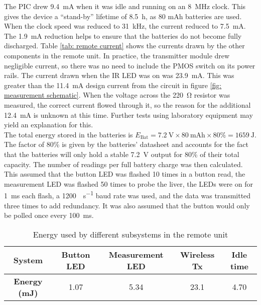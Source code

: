 The PIC drew \SI{9.4}{\milli\ampere} when it was idle and running on an \SI{8}{\mega\hertz} clock. This gives the device a ``stand-by'' lifetime of \SI{8.5}{\hour}, as 80 mAh batteries are used. When the clock speed was reduced to \SI{31}{\kilo\hertz}, the current reduced to \SI{7.5}{\milli\ampere}. The \SI{1.9}{\milli\ampere} reduction helps to ensure that the batteries do not become fully discharged. Table \ref{tab: remote current} shows the currents drawn by the other components in the remote unit. In practice, the transmitter module drew negligible current, so there was no need to include the PMOS switch on its power rails. The current drawn when the IR LED was on was \SI{23.9}{\milli\ampere}. This was greater than the \SI{11.4}{\milli\ampere} design current from the circuit in figure \ref{fig: measurement schematic}. When the voltage across the \SI{220}{\ohm} resistor was measured, the correct current flowed through it, so the reason for the additional \SI{12.4}{\milli\ampere} is unknown at this time. Further tests using laboratory equipment may yield an explanation for this.\\

The total energy stored in the batteries is $E_\text{Bat} = \SI{7.2}{\volt}\times\SI{80}{\milli\ampere\hour}\times 80\% = \SI{1659}{\joule}$. The factor of 80\% is given by the batteries' datasheet \cite{rs_pro_batteries} and accounts for the fact that the batteries will only hold a stable \SI{7.2}{\volt} output for 80\% of their total capacity. The number of readings per full battery charge was then calculated. This assumed that the button LED was flashed 10 times in a button read, the measurement LED was flashed 50 times to probe the liver, the LEDs were on for \SI{1}{\milli\second} each flash, a \SI{1200}{\bit\per\second} baud rate was used, and the data was transmitted three times to add redundancy. It was also assumed that the button would only be polled once every \SI{100}{\milli\second}.\\

\begin{table}[ht]
	\begin{center}
	\caption{Energy used by different subsystems in the remote unit}
	\label{tab: remote energy}
	\begin{tabular}{*{5}{|c}|}
	\hline
	\textbf{System} & Button LED & Measurement LED & Wireless Tx & Idle time\\
	\hline
	\textbf{Energy (mJ)} & 1.07 & 5.34 & 23.1 & 4.70	 \\
	\hline
	\end{tabular}
	\end{center}
\end{table}

